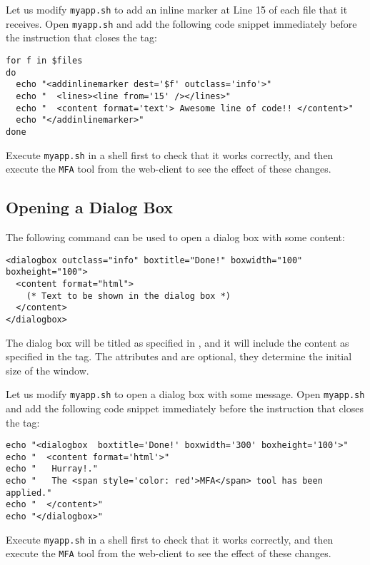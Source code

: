 Let us modify \texttt{myapp.sh} to add an inline marker at Line 15 of
each file that it receives. Open \texttt{myapp.sh} and add the
following code snippet immediately before the instruction that closes
the  tag:

\medskip
\begin{lstlisting}[style=script]
for f in $files 
do
  echo "<addinlinemarker dest='$f' outclass='info'>"
  echo "  <lines><line from='15' /></lines>"
  echo "  <content format='text'> Awesome line of code!! </content>"
  echo "</addinlinemarker>"
done
\end{lstlisting}

\medskip
\noindent
Execute \texttt{myapp.sh} in a shell first to check that it works
correctly, and then execute the \texttt{MFA} tool from the
web-client to see the effect of these changes.


\subsection{Opening a Dialog Box}

The following command can be used to open a dialog box with some
content:

\medskip
\begin{lstlisting}
<dialogbox outclass="info" boxtitle="Done!" boxwidth="100" boxheight="100"> 
  <content format="html">
    (* Text to be shown in the dialog box *)
  </content>
</dialogbox>
\end{lstlisting}

\medskip 
\noindent 
The dialog box will be titled as specified in , and it
will include the content as specified in the  tag. The
attributes  and  are optional, they
determine the initial size of the window.

Let us modify \texttt{myapp.sh} to open a dialog box with some
message. Open \texttt{myapp.sh} and add the following code snippet
immediately before the instruction that closes the 
tag:

\medskip
\begin{lstlisting}[style=script]
echo "<dialogbox  boxtitle='Done!' boxwidth='300' boxheight='100'>"
echo "  <content format='html'>"
echo "   Hurray!."
echo "   The <span style='color: red'>MFA</span> tool has been applied."
echo "  </content>"
echo "</dialogbox>"
\end{lstlisting}

\medskip
\noindent
Execute \texttt{myapp.sh} in a shell first to check that it works
correctly, and then execute the \texttt{MFA} tool from the
web-client to see the effect of these changes.



